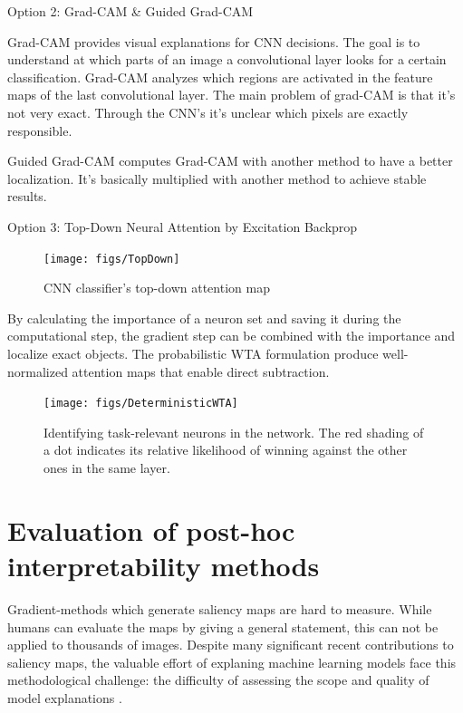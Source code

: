 


Option 2: Grad-CAM \& Guided Grad-CAM

Grad-CAM provides visual explanations for CNN decisions. The goal is to understand at which parts of an image a convolutional layer looks for a certain classification. Grad-CAM analyzes which regions are activated in the feature maps of the last convolutional layer. The main problem of grad-CAM is that it's not very exact. Through the CNN's it's unclear which pixels are exactly responsible.

Guided Grad-CAM computes Grad-CAM with another method to have a better localization. It's basically multiplied with another method to achieve stable results.





Option 3: Top-Down Neural Attention by Excitation Backprop \cite{article}




\begin{figure}[h!]
	\centering
	\texttt{[image: figs/TopDown]}
	\caption{CNN classifier's top-down attention map \cite{article}}
	\label{fig:topdown}
\end{figure}

By calculating the importance of a neuron set and saving it during the computational step, the gradient step can be combined with the importance and localize exact objects.
The probabilistic WTA formulation produce well-normalized attention maps that enable direct subtraction.


\begin{figure}[h!]
	\centering
	\texttt{[image: figs/DeterministicWTA]}
	\caption{Identifying task-relevant neurons in the network. The red shading of a dot indicates its relative likelihood of winning against the other ones in the same layer. \cite{article}}
	\label{fig:taskrelevant}
\end{figure}


\chapter{Evaluation of post-hoc interpretability methods}

Gradient-methods which generate saliency maps are hard to measure. While humans can evaluate the maps by giving a general statement, this can not be applied to thousands of images. Despite many significant recent contributions to saliency maps, the valuable effort of explaning machine learning models face this methodological challenge: the difficulty of assessing the scope and quality of model explanations \cite{adebayo2020sanity}.

